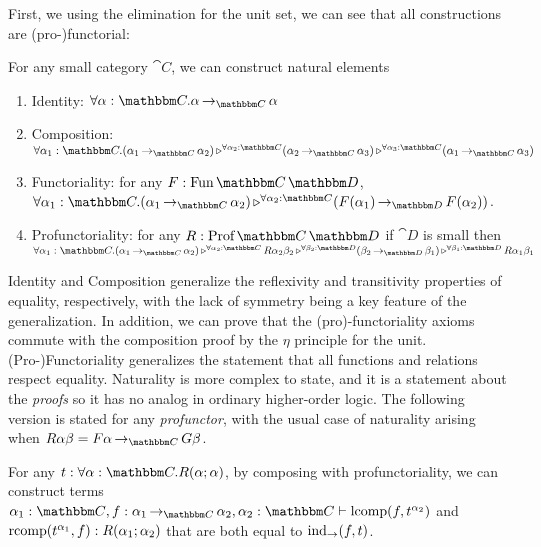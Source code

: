 \documentclass{llncs}
\begin{document}
First, we using the elimination for the unit set, we can see that all
constructions are (pro-)functorial:
\begin{construction}
  \label{construction:synthetic-composition}
  For any small category $\cat C$, we can construct natural elements
  \begin{enumerate}
  \item Identity: $\pendallXdotY {\alpha:\cat C} {\punitinXfromYtoZ {\cat C}{\alpha}{\alpha}}$
  \item Composition: $\hombinary {\alpha_1:\cat C} {(\punitinXfromYtoZ {\cat C}{\alpha_1}{\alpha_2})} {\alpha_2:\cat C} {(\punitinXfromYtoZ {\cat C}{\alpha_2}{\alpha_3})} {\alpha_3:\cat C} {(\punitinXfromYtoZ {\cat C}{\alpha_1}{\alpha_3})}$
  \item Functoriality: for any $F : \varr {\cat C}{\cat D}$, $\homunary {\alpha_1:\cat C} {(\punitinXfromYtoZ {\cat C}{\alpha_1}{\alpha_2})} {\alpha_2:\cat C} {(\punitinXfromYtoZ {\cat D} {F(\alpha_1)}{F(\alpha_2)})}$.
   \item Profunctoriality: for any $R : \harr {\cat C}{\cat D}$ if
     $\cat D$ is small then \\ $\homtrinary {\alpha_1:\cat C}
     {(\punitinXfromYtoZ{\cat C} {\alpha_1}{\alpha_2})} {\alpha_2:\cat C}
     {R{\alpha_2}{\beta_2}} {\beta_2:\cat D} {(\punitinXfromYtoZ{\cat D} {\beta_2}
       {\beta_1})} {\beta_1:\cat D} {R\alpha_1\beta_1}$
  \end{enumerate}
\end{construction}
Identity and Composition generalize the reflexivity and transitivity
properties of equality, respectively, with the lack of symmetry being
a key feature of the generalization.
%
In addition, we can prove that the (pro)-functoriality axioms commute
with the composition proof by the $\eta$ principle for the unit.
%
(Pro-)Functoriality generalizes the statement that all functions and
relations respect equality.
%
Naturality is more complex to state, and it is a statement about the
\emph{proofs} so it has no analog in ordinary higher-order
logic. The following version is stated for any \emph{profunctor}, with
the usual case of naturality arising when $R \alpha \beta =
\punitinXfromYtoZ {\cat C}{F \alpha}{G \beta}$.
\begin{lemma}[Naturality]
  For any $t : \pendallXdotY {\alpha:\cat C}{\harrapp R \alpha
    \alpha}$, by composing with profunctoriality, we can construct
  terms $\alpha_1:{\cat C}, f : \punitinXfromYtoZ {\cat C} {\alpha_1}
  {\alpha_2}, \alpha_2:{\cat C} \vdash \textrm{lcomp}(f,\pendappXtoY t
  {\alpha_2})$ and $\textrm{rcomp}(t^{\alpha_1}, f) :
  R(\alpha_1;\alpha_2)$ that are both equal to
  $\textrm{ind}_{\to}(f,t)$.
\end{lemma}
\end{document}
